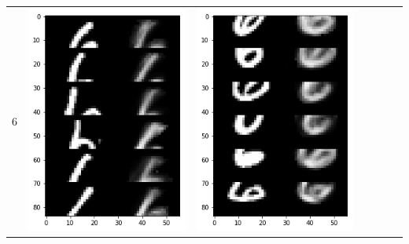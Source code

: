 \documentclass[12pt]{report} %
\begin{document}
\begin{tabular}{m{0.7cm}m{2.4cm}m{2.4cm}m{2.4cm}m{2.4cm}m{2.4cm}m{2.4cm}}
6 & \includegraphics[scale=0.3]{pictures/KE_6_up.png} & \includegraphics[scale=0.3]{pictures/KE_6_down.png} &

\end{tabular}
\end{document}
